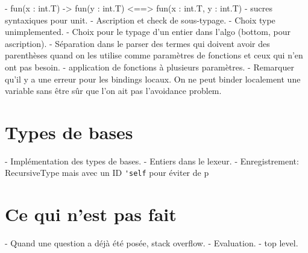 - fun(x : int.T) -> fun(y : int.T) <==> fun(x : int.T, y : int.T)
- sucres syntaxiques pour unit.
- Ascription et check de sous-typage.
- Choix type unimplemented.
- Choix pour le typage d'un entier dans l'algo (bottom, pour ascription).
- Séparation dans le parser des termes qui doivent avoir des parenthèses quand
on les utilise comme paramètres de fonctions et ceux qui n'en ont pas besoin.
- application de fonctions à plusieurs paramètres.
- Remarquer qu'il y a une erreur pour les bindings locaux. On ne peut binder
localement une variable sans être sûr que l'on ait pas l'avoidance problem.

\section{Types de bases}

- Implémentation des types de bases.
- Entiers dans le lexeur.
- Enregistrement: RecursiveType mais avec un ID \verb|'self| pour éviter de
p
\section{Ce qui n'est pas fait}

- Quand une question a déjà été posée, stack overflow.
- Evaluation.
- top level.